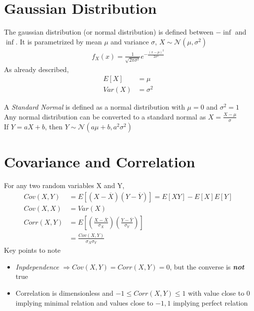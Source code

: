 \documentclass[11pt, a4paper]{article}
\begin{document}
    \section{Gaussian Distribution}
    The gaussian distribution (or normal distribution) is defined between $-\inf$ and $\inf$. It is parametrized by mean $\mu$ and variance $\sigma$, $X \sim \mathcal{N}(\mu, \sigma^{2})$
    \begin{align*}
        f_{X}(x) = \frac{1}{\sqrt{2\pi \sigma^{2}}} e^{-\frac{(x-\mu)^{2}}{2 \sigma^{2}}}
    \end{align*}
    As already described,
    \begin{align*}
        E[X] &= \mu\\
        Var(X) &= \sigma^{2}
    \end{align*}

    A \emph{Standard Normal} is defined as a normal distribution with $\mu = 0$ and $\sigma^{2} = 1$\\
    Any normal distribution can be converted to a standard normal as $X = \frac{X - \mu}{\sigma}$\\
    If $Y = aX + b$, then $Y \sim \mathcal{N}(a \mu + b, a^{2}\sigma^{2})$

    \section{Covariance and Correlation}
    For any two random variables X and Y,
    \begin{align*}
        Cov(X,Y) &= E[(X - \overline{X})(Y - \overline{Y})] = E[XY] - E[X]E[Y]\\
        Cov(X,X) &= Var(X)\\
        Corr(X,Y) &= E[(\frac{X - \overline{X}}{\sigma_{X}}) (\frac{Y - \overline{Y}}{\sigma_{Y}})]\\
        &= \frac{Cov(X,Y)}{\sigma_{X} \sigma_{Y}}
    \end{align*}
    Key points to note
    \begin{itemize}
        \item \emph{Inpdependence} $\Rightarrow Cov(X,Y) = Corr(X,Y) = 0$, but the converse is \emph{\textbf{not}} true
        \item Correlation is dimensionless and $-1 \leq Corr(X,Y) \leq 1$ with value close to $0$ implying minimal relation and values close to $-1, 1$ implying perfect relation
    \end{itemize}
\end{document}
